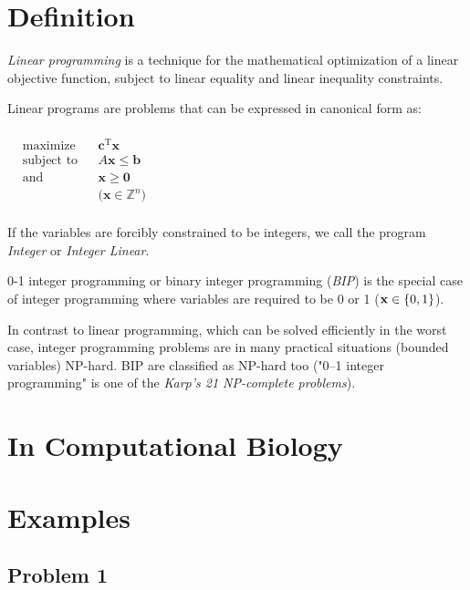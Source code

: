 \section{Definition} 
\textit{Linear programming} is a technique for the mathematical optimization of a linear objective function, subject to linear equality and linear inequality constraints.

Linear programs are problems that can be expressed in canonical form as:
\paragraph{}

${\displaystyle {\begin{aligned}
	&{\text{maximize}}&&\mathbf {c} ^{\mathrm {T} }\mathbf {x}
	\\&{\text{subject to}}&&A\mathbf {x} \leq \mathbf {b}
	\\&{\text{and}}&&\mathbf {x} \geq \mathbf {0}
	\\&&&{\text{(}}\mathbf {x} \in \mathbb {Z} ^{n}\text{)}
	\\&
	\end{aligned}}} $


If the variables are forcibly constrained to be integers, we call the program \textit{Integer} or \textit{Integer Linear}.

0-1 integer programming or binary integer programming (\textit{BIP}) is the special case of integer programming where variables are required to be 0 or 1 ($\mathbf {x} \in \mathbb \{0,1\} $).

In contrast to linear programming, which can be solved efficiently in the worst case, integer programming problems are in many practical situations (bounded variables) NP-hard. BIP are classified as NP-hard too ("0–1 integer programming" is one of the \textit{Karp's 21 NP-complete problems}).

\section{In Computational Biology}

\section{Examples}
\subsection{Problem 1}